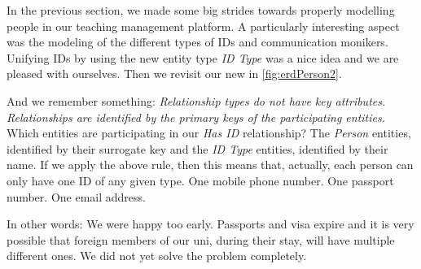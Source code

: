 %
%
\label{sec:weakEntities}%
%
In the previous section, we made some big strides towards properly modelling people in our teaching management platform.
A particularly interesting aspect was the modeling of the different types of IDs and communication monikers.
Unifying IDs by using the new entity type \emph{ID Type} was a nice idea and we are pleased with ourselves.
Then we revisit our new  in \cref{fig:erdPerson2}.

And we remember something:
\emph{Relationship types do not have key attributes. Relationships are identified by the primary keys of the participating entities.}
Which entities are participating in our \emph{Has ID} relationship?
The \emph{Person} entities, identified by their surrogate key and the \emph{ID Type} entities, identified by their name.
If we apply the above rule, then this means that, actually, each person can only have one ID of any given type.
One mobile phone number.
One passport number.
One email address.

In other words:
We were happy too early.
Passports and visa expire and it is very possible that foreign members of our uni, during their stay, will have multiple different ones.
We did not yet solve the problem completely.

